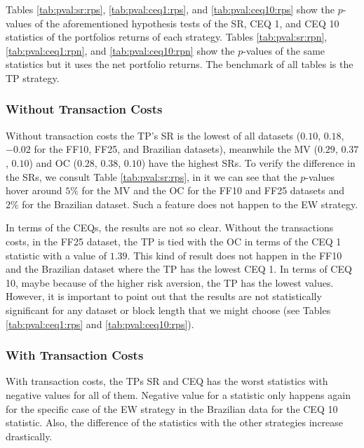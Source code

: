 \documentclass[12pt,oneside,a4paper]{memoir}
\begin{document}
Tables \ref{tab:pval:sr:rps}, \ref{tab:pval:ceq1:rps}, and \ref{tab:pval:ceq10:rps} show the $p$-values of the aforementioned hypothesis tests of the SR, CEQ 1, and CEQ 10 statistics of the portfolios returns of each strategy.
Tables \ref{tab:pval:sr:rpn}, \ref{tab:pval:ceq1:rpn}, and \ref{tab:pval:ceq10:rpn} show the $p$-values of the same statistics but it uses the net portfolio returns.
The benchmark of all tables is the TP strategy.

\subsubsection{Without Transaction Costs}

Without transaction costs the TP's SR is the lowest of all datasets ($0.10$, $0.18$, $-0.02$ for the FF10, FF25, and Brazilian datasets), meanwhile the MV ($0.29$, $0.37$, $0.10$) and OC ($0.28$, $0.38$, $0.10$) have the highest SRs.
To verify the difference in the SRs, we consult Table \ref{tab:pval:sr:rps}, in it we can see that the $p$-values hover around $5 \%$ for the MV and the OC for the FF10 and FF25 datasets and $2 \%$ for the Brazilian dataset.
Such a feature does not happen to the EW strategy.

In terms of the CEQs, the results are not so clear.
Without the transactions costs, in the FF25 dataset, the TP is tied with the OC in terms of the CEQ 1 statistic with a value of $1.39$.
This kind of result does not happen in the FF10 and the Brazilian dataset where the TP has the lowest CEQ 1.
In terms of CEQ 10, maybe because of the higher risk aversion, the TP has the lowest values.
However, it is important to point out that the results are not statistically significant for any dataset or block length that we might choose (see Tables \ref{tab:pval:ceq1:rps} and \ref{tab:pval:ceq10:rps}).

\subsubsection{With Transaction Costs}

With transaction costs, the TPs SR and CEQ has the worst statistics with negative values for all of them.
Negative value for a statistic only happens again for the specific case of the EW strategy in the Brazilian data for the CEQ 10 statistic.
Also, the difference of the statistics with the other strategies increase drastically.
\end{document}
